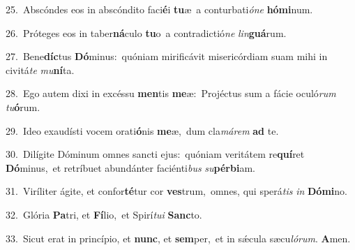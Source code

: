 {\numbfont\textcolor{\numbcolor}{25.}}~Abscóndes eos in abscóndito faci\-\textbf{é}\-i \textbf{tu}\-æ~\star a conturbati\-\textit{ó}\-\textit{ne} \textbf{hó}\-\textbf{mi}num.\par
{\numbfont\textcolor{\numbcolor}{26.}}~Próteges eos in taber\-\textbf{ná}\-culo \textbf{tu}\-o~\star a contradictió\textit{ne} \textit{lin}\-\textbf{guá}rum.\par
{\numbfont\textcolor{\numbcolor}{27.}}~Bene\-\textbf{díc}\-tus \textbf{Dó}\-minus:~\star quóniam mirificávit misericórdiam suam mihi in civitá\textit{te} \textit{mu}\-\textbf{ní}ta.\par
{\numbfont\textcolor{\numbcolor}{28.}}~Ego autem dixi in excéssu \textbf{men}\-tis \textbf{me}\-æ:~\star Projéctus sum a fácie oculó\textit{rum} \textit{tu}\-\textbf{ó}rum.\par
{\numbfont\textcolor{\numbcolor}{29.}}~Ideo exaudísti vocem orati\-\textbf{ó}\-nis \textbf{me}\-æ,~\star dum cla\-\textit{má}\-\textit{rem} \textbf{ad} te.\par
{\numbfont\textcolor{\numbcolor}{30.}}~Dilígite Dóminum omnes sancti ejus:~\dagger quóniam veritátem re\-\textbf{quí}\-ret \textbf{Dó}\-minus,~\star et retríbuet abundánter faciénti\textit{bus} \textit{su}\-\textbf{pér}\textbf{bi}am.\par
{\numbfont\textcolor{\numbcolor}{31.}}~Viríliter ágite, et confor\-\textbf{té}\-tur cor \textbf{ves}\-trum,~\star omnes, qui sperá\textit{tis} \textit{in} \textbf{Dó}\-\textbf{mi}no.\par
{\numbfont\textcolor{\numbcolor}{32.}}~Glória \textbf{Pa}\-tri, et \textbf{Fí}\-lio,~\star et Spirí\-\textit{tu}\-\textit{i} \textbf{Sanc}\-to.\par
{\numbfont\textcolor{\numbcolor}{33.}}~Sicut erat in princípio, et \textbf{nunc}\-, et \textbf{sem}\-per,~\star et in sǽcula sæcu\-\textit{ló}\-\textit{rum}. \textbf{A}\-men.\par
